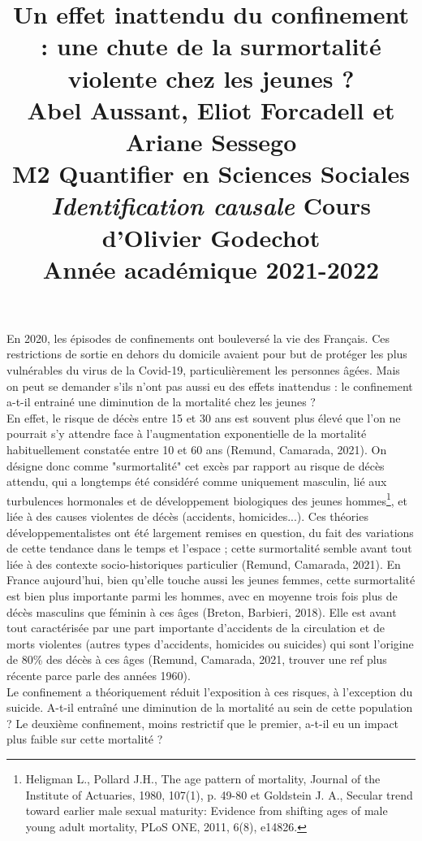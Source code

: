 \documentclass{article}
\title{\centering 

\vspace{1 cm}

{\begin{minipage}\linewidth
        \centering
     \textbf{ Un effet inattendu du confinement : une chute de la surmortalité violente chez les jeunes ?} \\[1 cm] 
        \vspace{0.5cm}
        \large Abel Aussant, Eliot Forcadell et Ariane Sessego\\
         M2 Quantifier en Sciences Sociales\\
        \vspace{0.5cm}
         \textit{Identification causale} Cours d'Olivier Godechot \\
         Année académique 2021-2022\\
    \end{minipage}}
  }
\date{}
\begin{document}

\maketitle

\cleardoublepage%

En 2020, les épisodes de confinements ont bouleversé la vie des Français. Ces restrictions de sortie en dehors du domicile avaient pour but de protéger les plus vulnérables du virus de la Covid-19, particulièrement les personnes âgées. Mais on peut se demander s'ils n'ont pas aussi eu des effets inattendus : le confinement a-t-il entrainé une diminution de la mortalité chez les jeunes ? \\

En effet, le risque de décès entre 15 et 30 ans est souvent plus élevé que l'on ne pourrait s'y attendre face à l'augmentation exponentielle de la mortalité habituellement constatée entre 10 et 60 ans (Remund, Camarada, 2021). On désigne donc comme "surmortalité" cet excès par rapport au risque de décès attendu, qui a longtemps été considéré comme uniquement masculin, lié aux turbulences hormonales et de développement biologiques des jeunes hommes\footnote{Heligman L., Pollard J.H., The age pattern of mortality, Journal of the Institute of Actuaries, 1980, 107(1), p. 49-80 et  Goldstein J. A., Secular trend toward earlier male sexual maturity: Evidence from shifting ages of male young adult mortality, PLoS ONE, 2011, 6(8), e14826.}, et liée à des causes violentes de décès (accidents, homicides...). Ces théories développementalistes ont été largement remises en question, du fait des variations de cette tendance dans le temps et l'espace ; cette surmortalité semble avant tout liée à des contexte socio-historiques particulier (Remund, Camarada, 2021). En France aujourd'hui, bien qu'elle touche aussi les jeunes femmes, cette surmortalité est bien plus importante parmi les hommes, avec en moyenne trois fois plus de décès masculins que féminin à ces âges (Breton, Barbieri, 2018). Elle est avant tout caractérisée par une part importante d'accidents de la circulation et de morts violentes (autres types d'accidents, homicides ou suicides) qui sont l'origine de 80\% des décès à ces âges (Remund, Camarada, 2021, trouver une ref plus récente parce parle des années 1960). \\

Le confinement a théoriquement réduit l'exposition à ces risques, à l'exception du suicide. A-t-il entraîné une diminution de la mortalité au sein de cette population ? Le deuxième confinement, moins restrictif que le premier, a-t-il eu un impact plus faible sur cette mortalité ? \\
\end{document}
